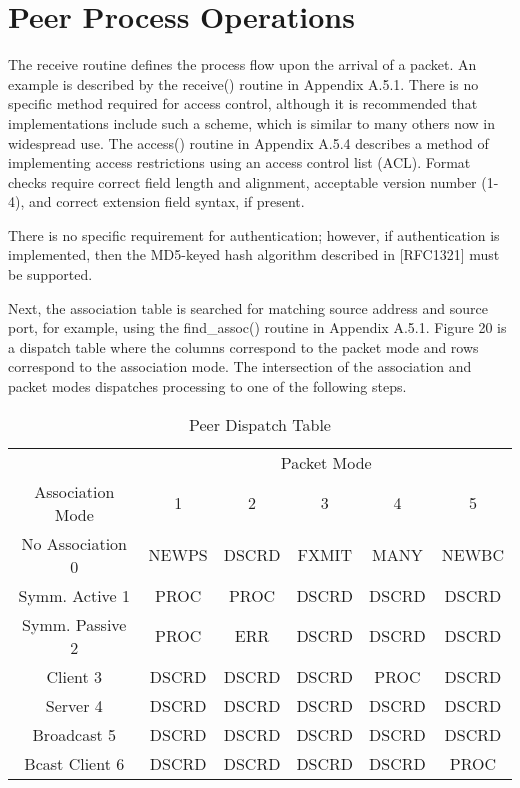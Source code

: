 \section{Peer Process Operations}

The receive routine defines the process flow upon the arrival of a
packet. An example is described by the receive() routine in
Appendix A.5.1. There is no specific method required for access
control, although it is recommended that implementations include such
a scheme, which is similar to many others now in widespread use. The
access() routine in Appendix A.5.4 describes a method of implementing
access restrictions using an access control list (ACL). Format
checks require correct field length and alignment, acceptable version
number (1-4), and correct extension field syntax, if present.

There is no specific requirement for authentication; however, if
authentication is implemented, then the MD5-keyed hash algorithm
described in [RFC1321] must be supported.

Next, the association table is searched for matching source address
and source port, for example, using the find\_assoc() routine in
Appendix A.5.1. Figure 20 is a dispatch table where the columns
correspond to the packet mode and rows correspond to the association
mode. The intersection of the association and packet modes
dispatches processing to one of the following steps.

\begin{table}[htb]
\center
\begin{tabular}{c | c | c | c | c | c}
 & \multicolumn{5}{c}{Packet Mode} \\
Association Mode & 1 & 2 & 3 & 4 & 5 \\
\hline
\hline
No Association 0 & NEWPS & DSCRD & FXMIT & MANY & NEWBC \\
Symm. Active 1 & PROC & PROC & DSCRD & DSCRD & DSCRD \\
Symm. Passive 2 & PROC & ERR & DSCRD & DSCRD & DSCRD \\
Client 3 & DSCRD & DSCRD & DSCRD & PROC & DSCRD \\
Server 4 & DSCRD & DSCRD & DSCRD & DSCRD & DSCRD \\
Broadcast 5 & DSCRD & DSCRD & DSCRD & DSCRD & DSCRD \\
Bcast Client 6 & DSCRD & DSCRD & DSCRD & DSCRD & PROC \\
\hline
\end{tabular}
\label{peer_dispatch_table}
\caption{Peer Dispatch Table}
\end{table}

